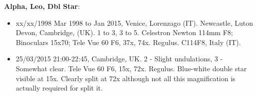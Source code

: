 {\bf Alpha, Leo, Dbl Star}:
\begin{itemize}
\item xx/xx/1998 Mar 1998 to Jan 2015, Venice, Lorenzago (IT). Newcastle, Luton Devon, Cambridge, (UK). 1 to 3, 3 to 5. Celestron Newton 114mm F8; Binoculars 15x70; Tele Vue 60 F6, 37x, 74x. Regulus. C114F8, Italy (IT).
\item 25/03/2015 21:00-22:45, Cambridge, UK. 2 - Slight undulations, 3 - Somewhat clear. Tele Vue 60 F6, 15x, 72x. Regulus. Blue-white double star visible at 15x. Clearly split at 72x although not all this magnification is actually required for split it.
\end{itemize}
